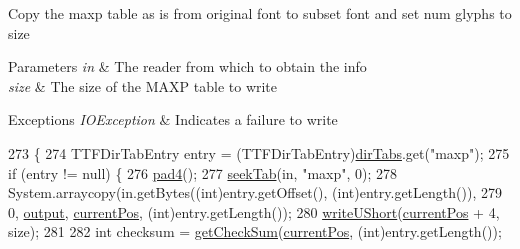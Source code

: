 Copy the maxp table as is from original font to subset font and set num glyphs to size


\begin{DoxyParams}{Parameters}
{\em in} & The reader from which to obtain the info \\
\hline
{\em size} & The size of the M\+A\+XP table to write \\
\hline
\end{DoxyParams}

\begin{DoxyExceptions}{Exceptions}
{\em I\+O\+Exception} & Indicates a failure to write \\
\hline
\end{DoxyExceptions}

\begin{DoxyCode}
273                                                                             \{
274         TTFDirTabEntry entry = (TTFDirTabEntry)\mbox{\hyperlink{classorg_1_1newdawn_1_1slick_1_1tools_1_1hiero_1_1truetype_1_1_t_t_f_file_ace74820d11ce19f9c04797c2715ac728}{dirTabs}}.get(\textcolor{stringliteral}{"maxp"});
275         \textcolor{keywordflow}{if} (entry != null) \{
276             \mbox{\hyperlink{classorg_1_1newdawn_1_1slick_1_1tools_1_1hiero_1_1truetype_1_1_t_t_f_sub_set_file_a0c2daa792c418ab2f19378ed0189e713}{pad4}}();
277             \mbox{\hyperlink{classorg_1_1newdawn_1_1slick_1_1tools_1_1hiero_1_1truetype_1_1_t_t_f_file_abccbd8b00bcebc8015fa41fef0239cf4}{seekTab}}(in, \textcolor{stringliteral}{"maxp"}, 0);
278             System.arraycopy(in.getBytes((\textcolor{keywordtype}{int})entry.getOffset(), (int)entry.getLength()),
279                              0, \mbox{\hyperlink{classorg_1_1newdawn_1_1slick_1_1tools_1_1hiero_1_1truetype_1_1_t_t_f_sub_set_file_a967f26c7cbd2c428f7ca96c4958edded}{output}}, \mbox{\hyperlink{classorg_1_1newdawn_1_1slick_1_1tools_1_1hiero_1_1truetype_1_1_t_t_f_sub_set_file_a5027011db0d9c307afa8de09102eaa10}{currentPos}}, (\textcolor{keywordtype}{int})entry.getLength());
280             \mbox{\hyperlink{classorg_1_1newdawn_1_1slick_1_1tools_1_1hiero_1_1truetype_1_1_t_t_f_sub_set_file_a9a4efc8b486dad23193ba0949bf1e533}{writeUShort}}(\mbox{\hyperlink{classorg_1_1newdawn_1_1slick_1_1tools_1_1hiero_1_1truetype_1_1_t_t_f_sub_set_file_a5027011db0d9c307afa8de09102eaa10}{currentPos}} + 4, size);
281 
282             \textcolor{keywordtype}{int} checksum = \mbox{\hyperlink{classorg_1_1newdawn_1_1slick_1_1tools_1_1hiero_1_1truetype_1_1_t_t_f_sub_set_file_a1626ba6cefcce691896866cd811ea675}{getCheckSum}}(\mbox{\hyperlink{classorg_1_1newdawn_1_1slick_1_1tools_1_1hiero_1_1truetype_1_1_t_t_f_sub_set_file_a5027011db0d9c307afa8de09102eaa10}{currentPos}}, (\textcolor{keywordtype}{int})entry.getLength());

\end{DoxyCode}
